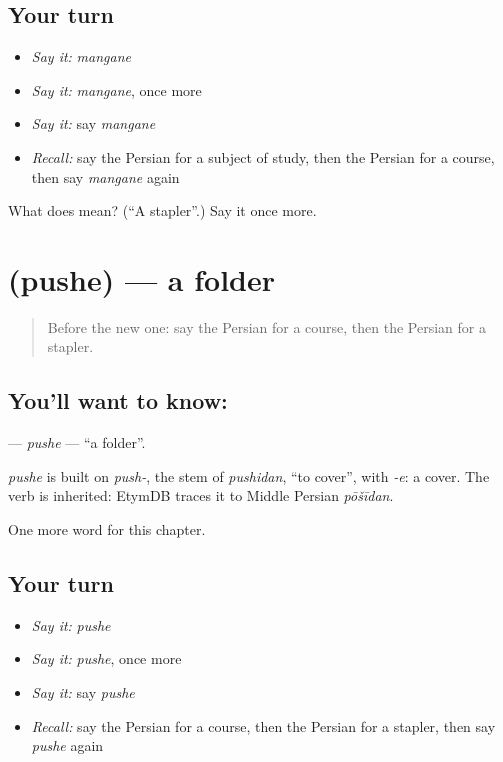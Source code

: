 \subsection*{Your turn}
\begin{itemize}
\raggedright
  \item \emph{Say it:} \emph{mangane}
  \item \emph{Say it:} \emph{mangane}, once more
  \item \emph{Say it:} say \emph{mangane}
  \item \emph{Recall:} say the Persian for a subject of study, then the Persian for a course, then say \emph{mangane} again
\end{itemize}

\begin{tcolorbox}[breakable,colback=teal!4,colframe=teal!35!black,title={Before you move on}]
What does  mean? (\textquotedblleft{}A stapler\textquotedblright{}.) Say it once more.
\end{tcolorbox}
\section[\texorpdfstring{\fa{پوشه} (pushe)}{پوشه (pushe)}]{ (pushe) — a folder}

\label{lesson:FA-C178-pushe}



\begin{quote}
Before the new one: say the Persian for a course, then the Persian for a stapler.
\end{quote}

\subsection*{You'll want to know: }
\textbf{} — \emph{pushe} — \textquotedblleft{}a folder\textquotedblright{}.

\begin{cousinweb}
\emph{pushe} is built on \emph{push-}, the stem of \emph{pushidan}, \textquotedblleft{}to cover\textquotedblright{}, with \emph{-e}: a cover. The verb is inherited: EtymDB traces it to Middle Persian \emph{pōšīdan}.
\end{cousinweb}

\begin{grammarlens}[title={What you've built}]
One more word for this chapter.
\end{grammarlens}

\subsection*{Your turn}
\begin{itemize}
\raggedright
  \item \emph{Say it:} \emph{pushe}
  \item \emph{Say it:} \emph{pushe}, once more
  \item \emph{Say it:} say \emph{pushe}
  \item \emph{Recall:} say the Persian for a course, then the Persian for a stapler, then say \emph{pushe} again
\end{itemize}

